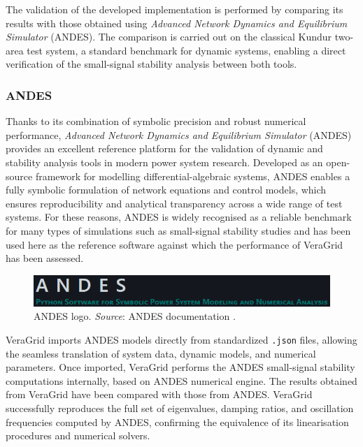 
The validation of the developed implementation is performed by comparing its results with those obtained using 
\textit{Advanced Network Dynamics and Equilibrium Simulator} (ANDES). The comparison is carried out on the classical Kundur two-area test system, 
a standard benchmark for dynamic systems, enabling a direct verification of the small-signal stability analysis between both tools.


\subsubsection{ANDES}

Thanks to its combination of symbolic precision and robust numerical performance, \textit{Advanced Network Dynamics and Equilibrium Simulator} (ANDES) 
provides an excellent reference platform for the validation of dynamic and stability analysis tools in modern power system research. 
Developed as an open-source framework for modelling differential-algebraic systems, ANDES enables a fully symbolic formulation of network equations and 
control models, which ensures reproducibility and analytical transparency across a wide range of test systems. 
For these reasons, ANDES is widely recognised as a reliable benchmark for many types of simulations such as small-signal stability studies and has been 
used here as the reference software against which the performance of VeraGrid has been assessed.

\begin{figure}[H]
    \centering
    \includegraphics[width=0.9\linewidth]{figures/ANDES_banner.png}
    \caption{ANDES logo. \textit{Source}: ANDES documentation \cite{andes}.}
\end{figure}

VeraGrid imports ANDES models directly from standardized \texttt{.json} files, allowing the seamless translation of system data, dynamic models, 
and numerical parameters. Once imported, VeraGrid performs the ANDES small-signal stability computations internally, based on ANDES numerical engine. 
The results obtained from VeraGrid have been compared with those from ANDES. VeraGrid successfully reproduces the full set of eigenvalues,
damping ratios, and oscillation frequencies computed by ANDES, confirming the equivalence of its linearisation procedures and numerical solvers. 

